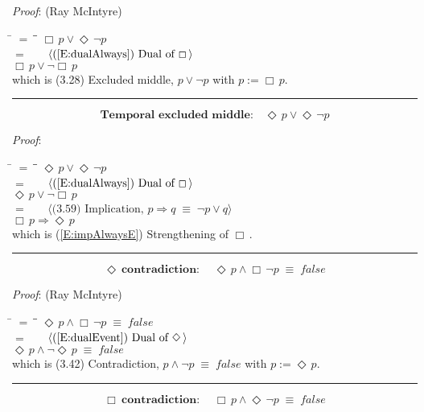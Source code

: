 \documentclass[12pt, fleqn, leqno]{article}
\newcommand{\lgap}{2pt}                             %
\newcommand{\mymathindent}{24pt}                    %
\newcommand{\equivs}{\ensuremath{\;\equiv\;}}       %
\newcommand{\impl}{\ensuremath{\Rightarrow}}        %
\newcommand{\Event}{\Diamond\,}
\newcommand{\Always}{\Box\,}
\newcommand{\myqed}{\rule[-.23ex]{1.2ex}{2.0ex}}
\newcommand{\myqedtab}{\hspace{384pt}}              %
\newcommand{\Gll} {\langle}                         %
\newcommand{\Ggg} {\rangle}                         %
\newcommand{\Hint}[1]     {\ \ \ $\Gll              \mbox{#1} \Ggg$ }   %
\begin{document}
\emph{Proof}: (Ray McIntyre)
\begin{tabbing}
\hspace{\mymathindent} \= $= \;$ \= \myqedtab \= \kill
  \> \>   $\Always p \lor \Event\neg p$\\[\lgap]
  \> $=$  \>  \Hint{(\ref{E:dualAlways}) Dual of $\Always$}\\[\lgap]
  \> \>   $\Always p \lor \neg\Always p$\\[\lgap]
  \> which is (3.28) Excluded middle, $p\lor\neg p$ with $p := \Always p$. \quad \myqed
\end{tabbing}
\begin{equation}\label{E:excludedMidc}
\textbf{Temporal excluded middle:}\quad \Event p \lor \Event\neg p
\end{equation}

\emph{Proof}:
\begin{tabbing}
\hspace{\mymathindent} \= $= \;$ \= \myqedtab \= \kill
  \> \>   $\Event p \lor \Event\neg p$\\[\lgap]
  \> $=$  \>  \Hint{(\ref{E:dualAlways}) Dual of $\Always$}\\[\lgap]
  \> \>   $\Event p \lor \neg\Always p$\\[\lgap]
  \> $=$  \>  \Hint{(3.59) Implication, $p\impl q \equivs \neg p \lor q$}\\[\lgap]
  \> \>   $\Always p \impl \Event p$\\[\lgap]
  \> which is (\ref{E:impAlwaysE}) Strengthening of $\Always$. \quad \myqed
\end{tabbing}
\begin{equation}\label{E:contradiction}
\textbf{$\Event$ contradiction:}\quad \Event p \land \Always\neg p \equivs false
\end{equation}

\emph{Proof}: (Ray McIntyre)
\begin{tabbing}
\hspace{\mymathindent} \= $= \;$ \= \myqedtab \= \kill
  \> \>   $\Event p \land \Always\neg p \equivs false$\\[\lgap]
  \> $=$  \>  \Hint{(\ref{E:dualEvent}) Dual of $\Event$}\\[\lgap]
  \> \>   $\Event p \land \neg\Event p \equivs false$\\[\lgap]
  \> which is (3.42) Contradiction, $p\land\neg p \equivs false$ with $p := \Event p$. \quad \myqed
\end{tabbing}
\begin{equation}\label{E:contradictionb}
\textbf{$\Always$ contradiction:}\quad \Always p \land \Event\neg p \equivs false
\end{equation}
\end{document}
